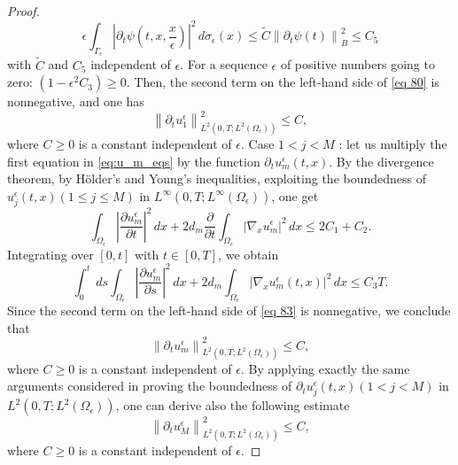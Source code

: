 \begin{proof}
$$
\epsilon \int_{\Gamma_{\epsilon}}\left|\partial_{t} \psi\left(t, x, \frac{x}{\epsilon}\right)\right|^{2} \, d  \sigma_{\epsilon}(x) \leq \tilde{C}\left\|\partial_{t} \psi(t)\right\|_{B}^{2} \leq C_{5}
$$
with $\tilde{C}$ and $C_{5}$ independent of $\epsilon$. For a sequence $\epsilon$ of positive numbers going to zero: $\left(1-\epsilon^{2} C_{3}\right) \geq 0$. Then, the second term on the left-hand side of \eqref{eq 80} is nonnegative, and one has
\begin{equation}
  \left\|\partial_{t} u_{1}^{\epsilon}\right\|_{L^{2}\left(0, T ; L^{2}\left(\Omega_{\epsilon}\right)\right)}^{2} \leq C,
\label{eq 81}\end{equation}
where $C \geq 0$ is a constant independent of $\epsilon$.
Case $1<j<M$ : let us multiply the first equation in \eqref{eq:u_m_eqs} by the function $\partial_{t} u_{m}^{\epsilon}(t, x)$. By the divergence theorem, by Hölder's and Young's inequalities, exploiting the boundedness of $u_{j}^{\epsilon}(t, x)(1 \leq j \leq M)$ in $L^{\infty}\left(0, T ; L^{\infty}\left(\Omega_{\epsilon}\right)\right)$, one get
\begin{equation}
  \int_{\Omega_{\epsilon}}\left|\frac{\partial u_{m}^{\epsilon}}{\partial t}\right|^{2} \, d  x+2 d_{m} \frac{\partial}{\partial t} \int_{\Omega_{\epsilon}}\left|\nabla_{x} u_{m}^{\epsilon}\right|^{2} \, d  x \leq 2 C_{1}+C_{2}.
\label{eq 82}\end{equation}
Integrating over $[0, t]$ with $t \in[0, T]$, we obtain
\begin{equation}
  \int_{0}^{t} \, d  s \int_{\Omega_{\epsilon}}\left|\frac{\partial u_{m}^{\epsilon}}{\partial s}\right|^{2} \, d  x+2 d_{m} \int_{\Omega_{\epsilon}}\left|\nabla_{x} u_{m}^{\epsilon}(t, x)\right|^{2} \, d  x \leq C_{3} T.
\label{eq 83}\end{equation}
Since the second term on the left-hand side of \eqref{eq 83} is nonnegative, we conclude that 
\begin{equation}
  \left\|\partial_{t} u_{m}^{\epsilon}\right\|_{L^{2}\left(0, T ; L^{2}\left(\Omega_{\epsilon}\right)\right)}^{2} \leq C,
\label{eq 84}\end{equation}
where $C \geq 0$ is a constant independent of $\epsilon$.
By applying exactly the same arguments considered in proving the boundedness of $\partial_{t} u_{j}^{\epsilon}(t, x)(1<j<M)$ in $L^{2}\left(0, T ; L^{2}\left(\Omega_{\epsilon}\right)\right)$, one can derive also the following estimate
\begin{equation}
  \left\|\partial_{t} u_{M}^{\epsilon}\right\|_{L^{2}\left(0, T ; L^{2}\left(\Omega_{\epsilon}\right)\right)}^{2} \leq C,
\label{eq 85}\end{equation}
where $C \geq 0$ is a constant independent of $\epsilon$.
\end{proof}

